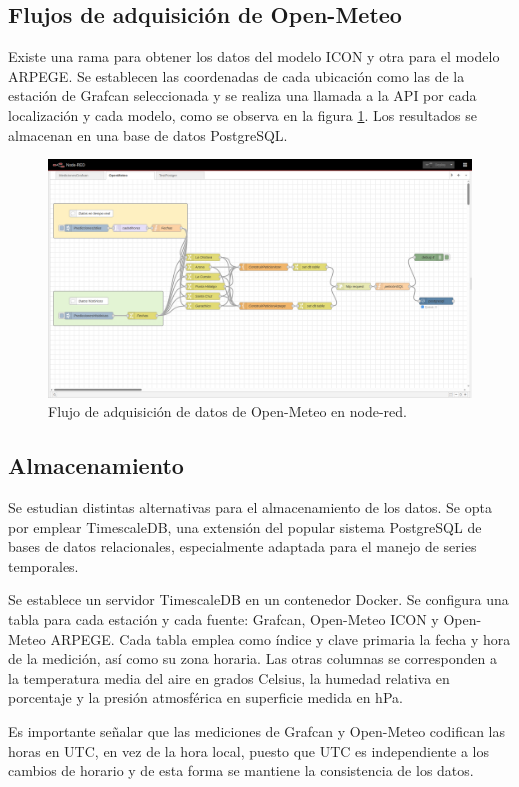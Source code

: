 \subsection{Flujos de adquisición de Open-Meteo}
Existe una rama para obtener los datos del modelo ICON y otra para el modelo ARPEGE. Se establecen las coordenadas de cada ubicación como las de la estación de Grafcan seleccionada 
y se realiza una llamada a la API por cada localización y cada modelo, como se observa en la figura \ref{open-meteo_flows}. 
Los resultados se almacenan en una base de datos PostgreSQL.
\begin{figure}[htb]
   \centering
   \includegraphics[width=1\linewidth]{images/node-red_open-meteo.png}
   \caption{Flujo de adquisición de datos de Open-Meteo en node-red.}
   \label{open-meteo_flows}
\end{figure}

\subsection{Almacenamiento}
Se estudian distintas alternativas para el almacenamiento de los datos.
Se opta por emplear TimescaleDB, una extensión del popular sistema PostgreSQL
de bases de datos relacionales, especialmente adaptada para el manejo de series temporales. 

Se establece un servidor TimescaleDB en un contenedor Docker. Se configura una tabla para cada estación y cada fuente: Grafcan, Open-Meteo ICON y Open-Meteo ARPEGE. 
Cada tabla emplea como índice y clave primaria la fecha y hora de la medición, así como su zona horaria. Las otras columnas se corresponden a la temperatura media del aire
 en grados Celsius, la humedad relativa en porcentaje y la presión atmosférica en superficie medida en hPa.

Es importante señalar que las mediciones de Grafcan y Open-Meteo codifican las horas en UTC, en vez de la hora local, puesto que UTC es independiente a los cambios de horario
y de esta forma se mantiene la consistencia de los datos.


